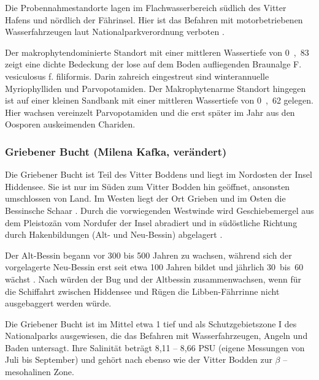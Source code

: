 Die Probennahmestandorte lagen im Flachwasserbereich südlich des Vitter Hafens und nördlich der Fährinsel. Hier ist das Befahren mit motorbetriebenen Wasserfahrzeugen laut Nationalparkverordnung verboten \citep{nationalparkplan_2002}.

Der makrophytendominierte Standort mit einer mittleren Wassertiefe von \unit{0,83}{\metre} zeigt eine dichte Bedeckung der lose auf dem Boden aufliegenden Braunalge F. vesiculosus f. filiformis. Darin zahreich eingestreut sind winterannuelle Myriophylliden und Parvopotamiden. Der Makrophytenarme Standort hingegen ist auf einer kleinen Sandbank mit einer mittleren Wassertiefe von \unit{0,62}{\metre} gelegen. Hier wachsen vereinzelt Parvopotamiden und die erst später im Jahr aus den Oosporen auskeimenden Chariden. 


\subsubsection{Griebener Bucht (Milena Kafka, verändert)}

Die Griebener Bucht ist Teil des Vitter Boddens und liegt im Nordosten der Insel Hiddensee. Sie ist nur im Süden zum Vitter Bodden hin geöffnet, ansonsten umschlossen von Land. Im Westen liegt der Ort Grieben und im Osten die Bessinsche Schaar \citep{mobus_2000}. Durch die vorwiegenden Westwinde wird  Geschiebemergel aus dem Pleistozän vom Nordufer der Insel abradiert und in südöstliche Richtung durch Hakenbildungen (Alt- und Neu-Bessin) abgelagert \citep{naumann_2012}.

Der Alt-Bessin begann vor 300 bis 500 Jahren zu wachsen, während sich der vorgelagerte Neu-Bessin erst seit etwa 100 Jahren bildet und jährlich \unit{30 bis 60}{\metre} wächst \citep{karge_2007}. Nach \cite{mobus_2000} würden der Bug und der Altbessin zusammenwachsen, wenn für die Schiffahrt zwischen Hiddensee und Rügen die Libben-Fährrinne nicht ausgebaggert werden würde.

Die Griebener Bucht ist im Mittel etwa \unit{1}{\metre} tief \citep{flugge_2004, hendreschke_2009} und als Schutzgebietszone I des Nationalparks ausgewiesen, die das Befahren mit Wasserfahrzeugen, Angeln und Baden untersagt. Ihre Salinität beträgt 8,11 – 8,66 PSU (eigene Messungen von Juli bis September) und gehört nach \cite{gosselck_2011} ebenso wie der Vitter Bodden zur $\beta$ – mesohalinen Zone.

